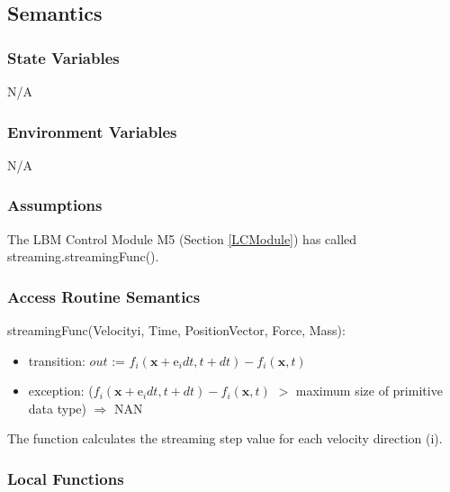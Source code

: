 \documentclass[12pt, titlepage]{article}
\begin{document}
\subsection{Semantics}

\subsubsection{State Variables}

N/A

\subsubsection{Environment Variables}
N/A

\subsubsection{Assumptions}

The LBM Control Module M5 (Section \ref{LCModule}) has called streaming.streamingFunc().

\subsubsection{Access Routine Semantics}

\noindent streamingFunc(Velocityi, Time, PositionVector, Force, Mass):
\begin{itemize}
	\item transition: $out$ := $f_i(\mathrm{\textbf{x}} +\mathrm{e}_i dt, t + dt) - f_i(\mathrm{\textbf{x}},t)$
	\item exception: ($f_i(\mathrm{\textbf{x}} +\mathrm{e}_i dt, t + dt) - f_i(\mathrm{\textbf{x}},t)$ $>$ maximum size of primitive data type) $\Rightarrow$ NAN
\end{itemize}

The function calculates the streaming step value for each velocity direction (i).

\subsubsection{Local Functions}
\end{document}
